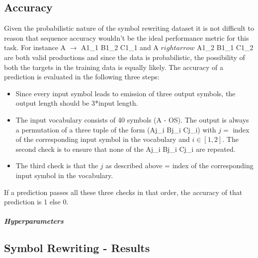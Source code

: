 \subsection{Accuracy}
Given the probabilistic nature of the symbol rewriting dataset it is not difficult to reason that sequence accuracy wouldn't be the ideal performance metric for this task. For instance A $\rightarrow$ A1\_1 B1\_2 C1\_1 and A $rightarrow$ A1\_2 B1\_1 C1\_2 are both valid productions and since the data is probabilistic, the possibility of both the targets in the training data is equally likely. The accuracy of a prediction is evaluated in the following three steps:
\begin{itemize}
	\item Since every input symbol leads to emission of three output symbols, the output length should be 3*input length.
	\item The input vocabulary consists of 40 symbols (A - OS). The output is always a permutation of a three tuple of the form (Aj\_i Bj\_i Cj\_i) with $j=$ index of the corresponding input symbol in the vocabulary and $i \in [1, 2] $. The second check is to ensure that none of the Aj\_i Bj\_i Cj\_i are repeated.
	\item The third check is that the $j$ as described above = index of the corresponding input symbol in the vocabulary.
\end{itemize}
If a prediction passes all these three checks in that order, the accuracy of that prediction is 1 else 0.

\subparagraph{Hyperparameters}

\subsection{Symbol Rewriting - Results}
